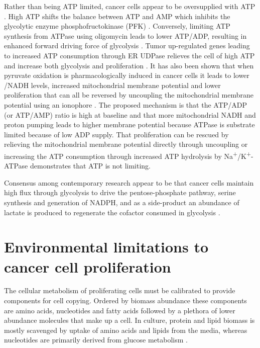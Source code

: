 Rather than being ATP limited, cancer cells appear to be oversupplied with ATP \cite{Scholnick1973-wx}.
High ATP shifts the balance between ATP and AMP which inhibits the glycolytic enzyme phosphofructokinase (PFK) \cite{Dunaway1983-ee}.
Conversely, limiting ATP synthesis from ATPase using oligomycin leads to lower ATP/ADP, resulting in enhanced forward driving force of glycolysis \cite{Park2019-cg}.
Tumor up-regulated genes leading to increased ATP consumption through ER UDPase relieves the cell of high ATP and increase both glycolysis and proliferation \cite{Fang2010-mj, Israelsen2010-ke}.
It has also been shown that when pyruvate oxidation is pharmacologically induced in cancer cells it leads to lower \NAD/NADH levels, increased mitochondrial membrane potential and lower proliferation that can all be reversed by uncoupling the mitochondrial membrane potential using an ionophore \cite{Luengo2021-kb}.
The proposed mechanism is that the ATP/ADP (or ATP/AMP) ratio is high at baseline and that more mitochondrial NADH and proton pumping leads to higher membrane potential because ATPase is substrate limited because of low ADP supply.
That proliferation can be rescued by relieving the mitochondrial membrane potential directly through uncoupling or increasing the ATP consumption through increased ATP hydrolysis by Na\textsuperscript{+}/K\textsuperscript{+}-ATPase demonstrates that ATP is not limiting.

Consensus among contemporary research appear to be that cancer cells maintain high flux through glycolysis to drive the pentose-phosphate pathway, serine synthesis and generation of NADPH, and as a side-product an abundance of lactate is produced to regenerate the \NAD{} cofactor consumed in glycolysis \cite{Vander_Heiden2017-eq, Chandel2021-rf}.




\section{Environmental limitations to cancer cell proliferation}
The cellular metabolism of proliferating cells must be calibrated to provide components for cell copying.
Ordered by biomass abundance these components are amino acids, nucleotides and fatty acids followed by a plethora of lower abundance molecules that make up a cell.
In culture, protein and lipid biomass is mostly scavenged by uptake of amino acids and lipids from the media, whereas nucleotides are primarily derived from glucose metabolism \cite{Hosios2016-us}.

